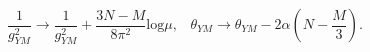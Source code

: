 \begin{equation}
\frac{1}{g^2_{YM}} \rightarrow \frac{1}{g^2_{YM}} + \frac{3N-M}{8 \pi^2}
\mbox{log} \mu, \,\,\, \, \, \theta_{YM} \rightarrow \theta_{YM} - 2\alpha 
\left( N - \frac{M}{3} \right).
\end{equation}


